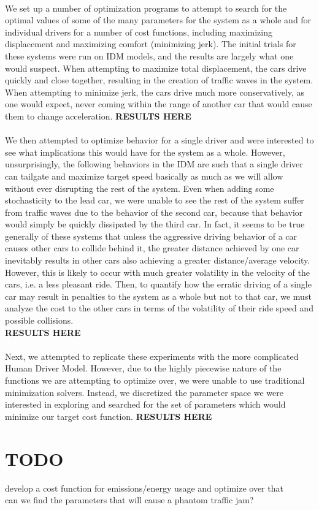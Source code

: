 \documentclass[11pt]{article}
\begin{document}
\paragraph{}We set up a number of optimization programs to attempt to search for the optimal values of some of the many parameters for the system as a whole and for individual drivers for a number of cost functions, including maximizing displacement and maximizing comfort (minimizing jerk). The initial trials for these systems were run on IDM models, and the results are largely what one would suspect. When attempting to maximize total displacement, the cars drive quickly and close together, resulting in the creation of traffic waves in the system. When attempting to minimize jerk, the cars drive much more conservatively, as one would expect, never coming within the range of another car that would cause them to change acceleration. 
\textbf{RESULTS HERE}
\paragraph{}We then attempted to optimize behavior for a single driver and were interested to see what implications this would have for the system as a whole. However, unsurprisingly, the following behaviors in the IDM are such that a single driver can tailgate and maximize target speed basically as much as we will allow without ever disrupting the rest of the system. Even when adding some stochasticity to the lead car, we were unable to see the rest of the system suffer from traffic waves due to the behavior of the second car, because that behavior would simply be quickly dissipated by the third car. In fact, it seems to be true generally of these systems that unless the aggressive driving behavior of a car causes other cars to collide behind it, the greater distance achieved by one car inevitably results in other cars also achieving a greater distance/average velocity. However, this is likely to occur with much greater volatility in the velocity of the cars, i.e. a less pleasant ride. Then, to quantify how the erratic driving of a single car may result in penalties to the system as a whole but not to that car, we must analyze the cost to the other cars in terms of the volatility of their ride speed and possible collisions.\\
\textbf{RESULTS HERE}
\paragraph{}Next, we attempted to replicate these experiments with the more complicated Human Driver Model. However, due to the highly piecewise nature of the functions we are attempting to optimize over, we were unable to use traditional minimization solvers. Instead, we discretized the parameter space we were interested in exploring and searched for the set of parameters which would minimize our target cost function.
\textbf{RESULTS HERE}
\section{TODO}
develop a cost function for emissions/energy usage and optimize over that \\
can we find the parameters that will cause a phantom traffic jam?
\end{document}
